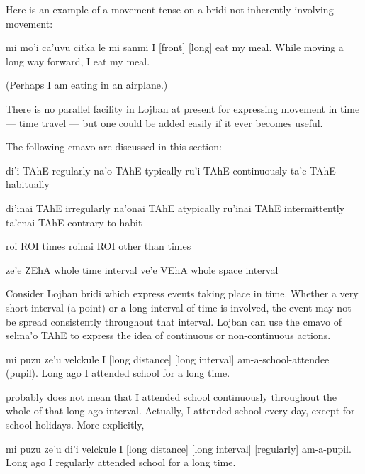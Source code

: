 Here is an example of a movement tense on a bridi not
    inherently involving movement:
\begin{example}
mi mo'i ca'uvu citka le mi sanmi\n
I  [front] [long] eat my meal.\n
While moving a long way forward, I eat my meal.
\end{example}

(Perhaps I am eating in an airplane.) 

There is no parallel facility in Lojban at present for
    expressing movement in time --- time travel --- but one could
    be added easily if it ever becomes useful.




The following cmavo are discussed in this section:

   di'i    TAhE    regularly
    na'o    TAhE    typically
    ru'i    TAhE    continuously
    ta'e    TAhE    habitually

di'inai TAhE    irregularly
    na'onai TAhE    atypically
    ru'inai TAhE    intermittently
    ta'enai TAhE    contrary to habit

roi ROI  times
    roinai  ROI other than  times

ze'e    ZEhA    whole time interval
    ve'e    VEhA    whole space interval    

Consider Lojban bridi which express events taking place in
    time. Whether a very short interval (a point) or a long
    interval of time is involved, the event may not be spread
    consistently throughout that interval. Lojban can use the cmavo
    of selma'o TAhE to express the idea of continuous or
    non-continuous actions.
\begin{example}
mi puzu ze'u\n
\T	velckule\n
I  [long distance] [long interval]\n
\T	am-a-school-attendee (pupil).\n
Long ago I attended school for a long time.
\end{example}

{\noindent}probably does not mean that I attended school continuously
    throughout the whole of that long-ago interval. Actually, I
    attended school every day, except for school holidays. More
    explicitly,
\begin{example}
mi puzu ze'u di'i\n
\T	velckule\n
I  [long distance] [long interval] [regularly]\n
\T	am-a-pupil.\n
Long ago I regularly attended school for a long time.
\end{example}

